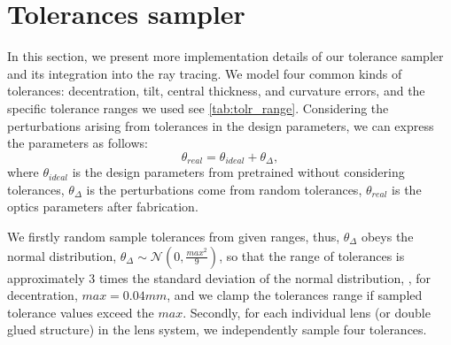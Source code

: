 \clearpage

\appendix
\renewcommand\thefigure{A\arabic{figure}}
\renewcommand\thetable{A\arabic{table}}  
\renewcommand\theequation{A\arabic{equation}}
\setcounter{section}{0}
\setcounter{equation}{0}
\setcounter{table}{0}
\setcounter{figure}{0}

\setcounter{page}{1}
\maketitlesupplementary


\section{Tolerances sampler}
\label{sec:supp}
In this section, we present more implementation details of our tolerance sampler and its integration into the ray tracing. We model four common kinds of tolerances: decentration, tilt, central thickness, and curvature errors, and the specific tolerance ranges we used see \cref{tab:tolr_range}. Considering the perturbations arising from tolerances in the design parameters, we can express the parameters as follows:
\begin{equation}
\theta_{real} = \theta_{ideal} + \theta_{\Delta},
\end{equation}
where $\theta_{ideal}$ is the design parameters from pretrained without considering tolerances, $\theta_{\Delta}$ is the perturbations come from random tolerances, $\theta_{real}$ is the optics parameters after fabrication. 

We firstly random sample tolerances from given ranges, thus, $\theta_{\Delta}$ obeys the normal distribution, $\theta_{\Delta} \sim \mathcal{N}(0, \frac{max^{2}}{9})$, so that the range of tolerances is approximately 3 times the standard deviation of the normal distribution, \eg, for decentration, $max=0.04mm$, and we clamp the tolerances range if sampled tolerance values exceed the $max$. Secondly, for each individual lens (or double glued structure) in the lens system, we independently sample four tolerances.

